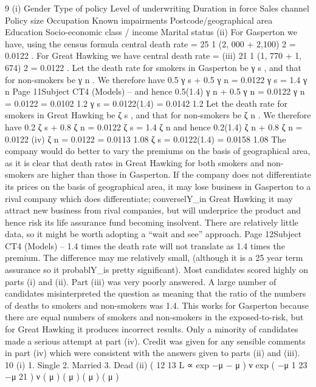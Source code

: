 
9
(i)
Gender
Type of policy
Level of underwriting
Duration in force
Sales channel
Policy size
Occupation
Known impairments
Postcode/geographical area
Education
Socio-economic class / income
Marital status
(ii)
For Gasperton we have, using the census formula central death rate
=
25
1
(2, 000 + 2,100)
2
= 0.0122 .
For Great Hawking we have central death rate
=
(iii)
21
1
(1, 770 + 1, 674)
2
= 0.0122 .
Let the death rate for smokers in Gasperton be γ s , and that for non-smokers be γ n .
We therefore have
0.5 γ s + 0.5 γ n = 0.0122
γ s = 1.4 γ n
Page 11Subject CT4 (Models) – %
and hence
0.5(1.4) γ n + 0.5 γ n = 0.0122
γ n = 0.0122
= 0.0102
1.2
γ s = 0.0122(1.4)
= 0.0142
1.2
Let the death rate for smokers in Great Hawking be ζ s , and that for
non-smokers be ζ n .
We therefore have
0.2 ζ s + 0.8 ζ n = 0.0122
ζ s = 1.4 ζ n
and hence
0.2(1.4) ζ n + 0.8 ζ n = 0.0122
(iv)
ζ n = 0.0122
= 0.0113
1.08
ζ s = 0.0122(1.4)
= 0.0158
1.08
The company would do better to vary the premiums on the basis of geographical area,
as it is clear that death rates in Great Hawking for both smokers and non-smokers are
higher than those in Gasperton.
If the company does not differentiate its prices on the basis of geographical area, it
may lose business in Gasperton to a rival company which does differentiate;
converselY_in Great Hawking it may attract new business from rival companies, but
will underprice the product and hence risk its life assurance fund becoming insolvent.
There are relatively little data, so it might be worth adopting a “wait and see”
approach.
Page 12Subject CT4 (Models) – %
1.4 times the death rate will not translate as 1.4 times the premium. The difference
may me relatively small, (although it is a 25 year term assurance so it probablY_is
pretty significant).
Most candidates scored highly on parts (i) and (ii). Part (iii) was very poorly answered. A
large number of candidates misinterpreted the question as meaning that the ratio of the
numbers of deaths to smokers and non-smokers was 1.4. This works for Gasperton because
there are equal numbers of smokers and non-smokers in the exposed-to-risk, but for Great
Hawking it produces incorrect results. Only a minority of candidates made a serious attempt
at part (iv). Credit was given for any sensible comments in part (iv) which were consistent
with the answers given to parts (ii) and (iii).
10
(i)
1. Single
2. Married
3. Dead
(ii)
{ (
12
13
L ∝ exp −μ − μ
) ν } exp { ( −μ
1
23
−μ
21
) ν } ( μ ) ( μ ) ( μ ) ( μ )
